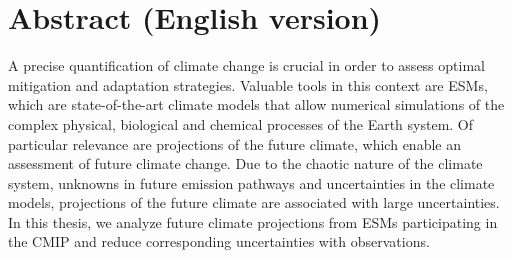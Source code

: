 


\chapter*{Abstract (English version)}

A precise quantification of climate change is crucial in order to assess
optimal mitigation and adaptation strategies. Valuable tools in this context
are \acp{ESM}, which are state-of-the-art climate models that allow numerical
simulations of the complex physical, biological and chemical processes of the
Earth system. Of particular relevance are projections of the future climate,
which enable an assessment of future climate change. Due to the chaotic nature
of the climate system, unknowns in future emission pathways and uncertainties
in the climate models, projections of the future climate are associated with
large uncertainties. In this thesis, we analyze future climate projections from
\acp{ESM} participating in the \ac{CMIP} and reduce corresponding uncertainties
with observations.
